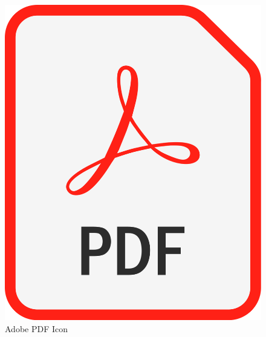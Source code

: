 \begin{figure}[]
	\centering
	\includegraphics[scale=0.1]{"images/PDFfileIcon.png"}
	\caption{Adobe PDF Icon \cite{wiki-pdf-engl}}
	\label{fig:icon}
\end{figure}
